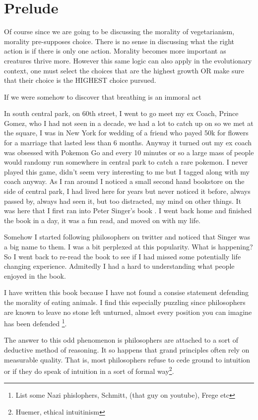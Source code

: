 
\chapter{Prelude}

Of course since we are going to be discussing the morality of vegetarianism, morality pre-supposes choice. There is no sense in discussing what the right action is if there is only one action. Morality becomes more important as creatures thrive more. However this same logic can also apply in the evolutionary context, one must select the choices that are the highest growth OR make sure that their choice is the HIGHEST choice pursued. 

If we were somehow to discover that breathing is an immoral act

In south central park, on 60th street, I went to go meet my ex Coach, Prince Gomez, who I had not seen in a decade, we had a lot to catch up on so we met at the square, I was in New York for wedding of a friend who payed 50k for flowers for a marriage that lasted less than 6 months. Anyway it turned out my ex coach was obsessed with Pokemon Go and every 10 minutes or so a large mass of people would randomy run somewhere in central park to catch a rare pokemon. I never played this game, didn't seem very interesting to me but I tagged along with my coach anyway. As I ran around I noticed a small second hand bookstore on the side of central park, I had lived here for years but never noticed it before, always passed by, always had seen it, but too distracted, my mind on other things. It was here that I first ran into Peter Singer's book \cite{singer1995animal}. I went back home and finished the book in a day, it was a fun read, and moved on with my life. 

Somehow I started following philosophers on twitter and noticed that Singer was a big name to them. I was a bit perplexed at this popularity. What is happening? So I went back to re-read the book to see if I had missed some potentially life changing experience. Admitedly I had a hard to understanding what people enjoyed in the book. 

I have written this book because I have not found a consise statement defending the morality of eating animals. I find this especially puzzling since philosophers are known to leave no stone left unturned, almost every position you can imagine has been defended \footnote{List some Nazi phislophers, Schmitt, (that guy on youtube), Frege etc}. 

The answer to this odd phenomenon is philosophers are attached to a sort of deductive method of reasoning. It so happens that grand principles often rely on measurable quality. That is, most philosophers refuse to cede ground to intuition or if they do speak of intuition in a sort of formal way\footnote{Huemer, ethical intuitinism}. 

